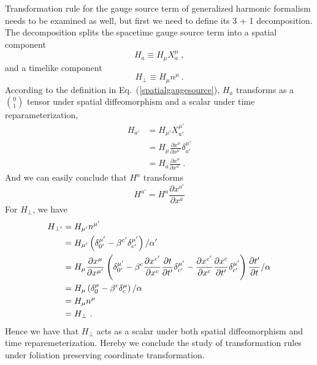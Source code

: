 Transformation rule for the gauge source term of generalized harmonic formalism needs to be examined as well, but first we need to define its 3 + 1 decomposition. The decomposition splits the spacetime gauge source term into a spatial component
\begin{equation}\label{spatialgaugesource}
	H_{a} \equiv H_{\mu}X^{\mu}_{a} \ ,
\end{equation}
and a timelike component
\begin{equation}
	H_{\perp} \equiv H_{\mu}n^{\mu} \ .
\end{equation}
According to the definition in Eq.~(\ref{spatialgaugesource}), $H_{a}$ transforms as a $0 \choose 1$ tensor under spatial diffeomorphism and a scalar under time reparameterization, 
\begin{align}
H_{a'} & = H_{\mu'}X^{\mu'}_{a'}\\
& = H_{\mu}\frac{\partial x^{\mu}}{\partial x^{\mu'}}\delta^{\mu'}_{a'}\\
& = H_{a}\frac{\partial x^{a}}{\partial x^{a'}} \ .
\end{align}
And we can easily conclude that $H^{a}$ transforms 
\begin{equation}
H^{a'} = H^{a}\frac{\partial x^{a'}}{\partial x^{a}}
\end{equation}
For $H_{\perp}$, we have
\begin{align}
H_{\perp'} & = H_{\mu'}n^{\mu'} \notag\\
& = H_{\mu'}\left(\delta^{\mu'}_{0'} - \beta^{c'}\delta_{c'}^{\mu'}\right)/\alpha'\notag\\
& = H_{\mu}\frac{\partial x^{\mu}}{\partial x^{\mu'}}\left(\delta^{\mu'}_{0'} - \beta^{c}\frac{\partial x^{c'}}{\partial x^{c}}\frac{\partial t}{\partial t'}\delta^{\mu'}_{c'} - \frac{\partial x^{c'}}{\partial x^{c}}\frac{\partial x^{c}}{\partial t'}\delta^{\mu'}_{c'}\right)\frac{\partial t'}{\partial t} / \alpha \notag\\
& = H_{\mu}\left(\delta^{\mu}_{0} - \beta^{c}\delta_{c}^{\mu}\right)/\alpha \notag\\
& = H_{\mu}n^{\mu} \notag\\
& = H_{\perp} \ .
\end{align}
Hence we have that $H_{\perp}$ acts as a scalar under both spatial diffeomorphism and time reparemeterization. Hereby we conclude the study of transformation rules under foliation preserving coordinate transformation. 

